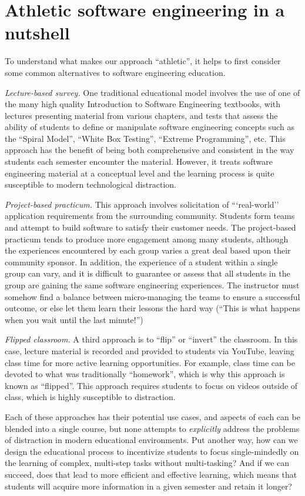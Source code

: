 \section{Athletic software engineering in a nutshell}

To understand what makes our approach ``athletic'', it helps to first consider some common alternatives to software engineering education. 

{\em Lecture-based survey.}  One traditional educational model involves the use of one of the many high quality Introduction to Software Engineering textbooks, with lectures presenting material from various chapters, and tests that assess the ability of students to define or manipulate software engineering concepts such as the ``Spiral Model'', ``White Box Testing'', ``Extreme Programming'', etc. This approach has the benefit of being both comprehensive and consistent in the way students each semester encounter the material. However, it treats software engineering material at a conceptual level and the learning process is quite susceptible to modern technological distraction.

{\em Project-based practicum.}  This approach involves solicitation of ```real-world'' application requirements from the surrounding community.  Students form teams and attempt to build software to satisfy their customer needs.  The project-based practicum tends to produce more engagement among many students, although the experiences encountered by each group varies a great deal based upon their community sponsor. In addition, the experience of a student within a single group can vary, and it is difficult to guarantee or assess that all students in the group are gaining the same software engineering experiences. The instructor must somehow find a balance between micro-managing the teams to ensure a successful outcome, or else let them learn their lessons the hard way (``This is what happens when you wait until the last minute!'')

{\em Flipped classroom.}  A third approach is to ``flip'' or ``invert'' the classroom. In this case, lecture material is recorded and provided to students via YouTube, leaving class time for more active learning opportunities. For example, class time can be devoted to what was traditionally ``homework'', which is why this approach is known as ``flipped''.  This approach requires students to focus on videos outside of class, which is highly susceptible to distraction.

Each of these approaches has their potential use cases, and aspects of each can be blended into a single course, but none attempts to {\em explicitly} address the problems of distraction in modern educational environments. Put another way, how can we design the educational process to incentivize students to focus single-mindedly on the learning of complex, multi-step tasks without multi-tasking?  And if we can succeed, does that lead to more efficient and effective learning, which means that students will acquire more information in a given semester and retain it longer? 

